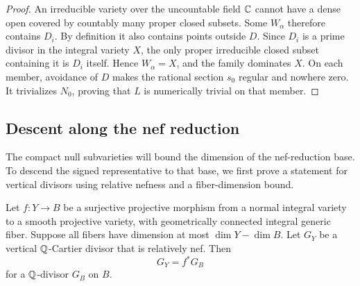 \begin{proof}
An irreducible variety over the uncountable field $\mathbb{C}$
cannot have a dense open covered by countably many proper
closed subsets.  Some $W_\alpha$ therefore contains $D_i$.
By definition it also contains points outside $D$.
Since $D_i$ is a prime divisor in the integral variety
$X$, the only proper irreducible closed subset containing
it is $D_i$ itself.  Hence $W_\alpha=X$, and the family
dominates $X$.  On each member, avoidance of $D$ makes
the rational section $s_0$ regular and nowhere zero.
It trivializes $N_0$, proving that $L$ is numerically
trivial on that member.
\end{proof}

\subsection{Descent along the nef reduction}

The compact null subvarieties will bound the dimension of the
nef-reduction base.  To descend the signed representative to
that base, we first prove a statement for vertical divisors
using relative nefness and a fiber-dimension bound.

\begin{lemma}\label{sg:vertical-descent}
Let $f:Y\to B$ be a surjective projective morphism from a
normal integral variety to a smooth projective variety,
with geometrically connected integral generic fiber.
Suppose all fibers have dimension at most
$\dim Y-\dim B$.  Let $G_Y$ be a vertical $\mathbb{Q}$-Cartier
divisor that is relatively nef.  Then
\[
 G_Y=f^*G_B
\]
for a $\mathbb{Q}$-divisor $G_B$ on $B$.
\end{lemma}

